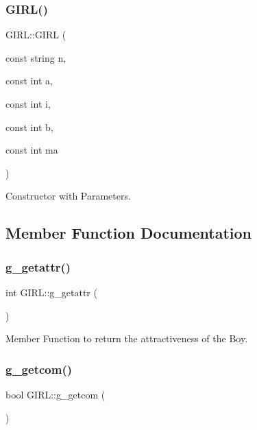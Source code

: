 \subsubsection{\texorpdfstring{G\+I\+R\+L()}{GIRL()}\hspace{0.1cm}{\footnotesize\ttfamily [2/2]}}
{\footnotesize\ttfamily G\+I\+R\+L\+::\+G\+I\+RL (\begin{DoxyParamCaption}\item[{const string}]{n,  }\item[{const int}]{a,  }\item[{const int}]{i,  }\item[{const int}]{b,  }\item[{const int}]{ma }\end{DoxyParamCaption})}



Constructor with Parameters. 



\subsection{Member Function Documentation}
\mbox{\label{class_g_i_r_l_a570d488790b429cc907f80a27bb219c2}} 
\subsubsection{\texorpdfstring{g\+\_\+getattr()}{g\_getattr()}}
{\footnotesize\ttfamily int G\+I\+R\+L\+::g\+\_\+getattr (\begin{DoxyParamCaption}{ }\end{DoxyParamCaption})}



Member Function to return the attractiveness of the Boy. 

\mbox{\label{class_g_i_r_l_a66f1cbdcb7d90355a2ff15234b2d8a43}} 
\subsubsection{\texorpdfstring{g\+\_\+getcom()}{g\_getcom()}}
{\footnotesize\ttfamily bool G\+I\+R\+L\+::g\+\_\+getcom (\begin{DoxyParamCaption}{ }\end{DoxyParamCaption})}



